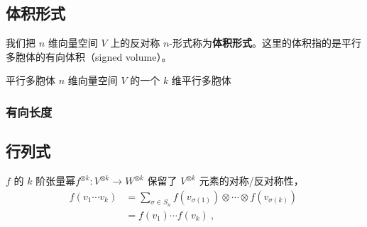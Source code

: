 
\begin{issues}
\issueDraft
\end{issues}


\subsection{体积形式}




我们把 $n$ 维向量空间 $V$ 上的反对称 $n$-形式称为\textbf{体积形式}。这里的体积指的是平行多胞体的有向体积（signed volume）。

\begin{definition}{平行多胞体}
$n$ 维向量空间 $V$ 的一个 $k$ 维平行多胞体
\end{definition}


\subsubsection{有向长度}

\subsection{行列式}

$f$ 的 $k$ 阶张量幂$f^{\otimes k}: V^{\otimes k} \to W^{\otimes k}$ 保留了 $V^{\otimes k}$ 元素的对称/反对称性，
\begin{equation}
\begin{aligned}
f(v_1 \cdots v_k) &= \sum_{\sigma \in S_n} f(v_{\sigma(1)}) \otimes \cdots \otimes f(v_{\sigma(k)}) \\
&= f(v_1) \cdots f(v_k)~,
\end{aligned}~
\end{equation}

